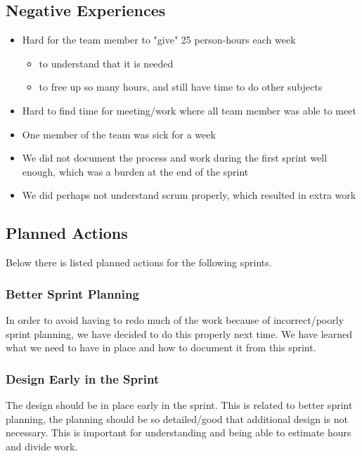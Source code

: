 \subsection{Negative Experiences}
\begin{itemize}
	\item Hard for the team member to "give" 25 person-hours each week
	\begin{itemize}
		\item to understand that it is needed
		\item to free up so many hours, and still have time to do other subjects
	\end{itemize}
	\item Hard to find time for meeting/work where all team member was able to meet
	\item One member of the team was sick for a week
	\item We did not document the process and work during the first sprint well enough, which was a burden at the end of the sprint
	\item We did perhaps not understand \Gls{scrum} properly, which resulted in extra work
\end{itemize}

\subsection{Planned Actions}
Below there is listed planned actions for the following sprints.

\subsubsection{Better Sprint Planning}
In order to avoid having to redo much of the work because of incorrect/poorly
sprint planning, we have decided to do this properly next time. We have learned
what we need to have in place and how to document it from this sprint.

\subsubsection{Design Early in the Sprint} 
The design should be in place early in the sprint. This is related to better
sprint planning, the planning should be so detailed/good that additional design
is not necessary. This is important for understanding and being able to
estimate hours and divide work.

